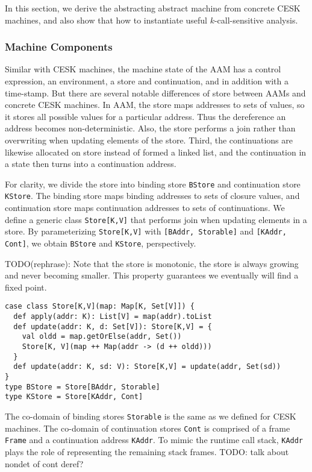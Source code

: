 \documentclass[acmsmall,review,anonymous]{acmart}\settopmatter{printfolios=true,printccs=false,printacmref=false}
\begin{document}
In this section, we derive the abstracting abstract machine from concrete
CESK machines, and also show that how to instantiate
useful $k$-call-sensitive analysis.

\subsubsection{Machine Components}

Similar with CESK machines, the machine state of the AAM has a control expression,
an environment, a store and continuation, and in addition with a time-stamp.
But there are several notable differences of store between AAMs and concrete CESK machines.
In AAM, the store maps addresses to sets of values, so it stores all possible values
for a particular address. Thus the dereference an address becomes non-deterministic.
Also, the store performs a join rather than overwriting when updating elements of the store.
Third, the continuations are likewise allocated on store instead of formed a linked list,
and the continuation in a state then turns into a continuation address.

For clarity, we divide the store into binding store \texttt{BStore} and continuation store \texttt{KStore}. 
The binding store maps binding addresses to sets of closure values, and continuation store maps
continuation addresses to sets of continuations.
We define a generic class \texttt{Store[K,V]} that performs join when updating elements
in a store. By parameterizing \texttt{Store[K,V]} with \texttt{[BAddr, Storable]} and 
\texttt{[KAddr, Cont]}, we obtain \texttt{BStore} and \texttt{KStore}, perspectively.

TODO(rephrase): Note that the store is monotonic, the store is always growing and never becoming 
smaller. This property guarantees we eventually will find a fixed point.

\begin{verbatim}
case class Store[K,V](map: Map[K, Set[V]]) {
  def apply(addr: K): List[V] = map(addr).toList
  def update(addr: K, d: Set[V]): Store[K,V] = {
    val oldd = map.getOrElse(addr, Set())
    Store[K, V](map ++ Map(addr -> (d ++ oldd)))
  }
  def update(addr: K, sd: V): Store[K,V] = update(addr, Set(sd))
}
type BStore = Store[BAddr, Storable]
type KStore = Store[KAddr, Cont]
\end{verbatim}

The co-domain of binding stores \texttt{Storable} is the same
as we defined for CESK machines.
The co-domain of continuation stores \texttt{Cont} is comprised of 
a frame \texttt{Frame} and a continuation address \texttt{KAddr}.
To mimic the runtime call stack, \texttt{KAddr} plays the role of
representing the remaining stack frames.
TODO: talk about nondet of cont deref?
\end{document}
